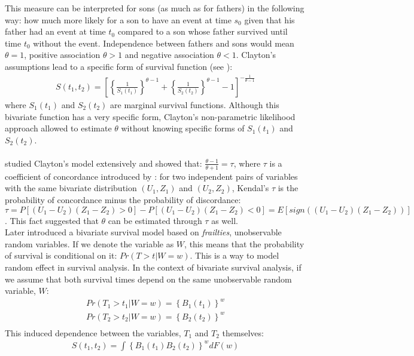 \documentclass[]{article}
\begin{document}
This measure can be interpreted for sons (as much as for fathers) in the following way: how much more likely for a son to have an event at time $s_0$ given that his father had an event at time $t_0$ compared to a son whose father survived until time $t_0$ without the event. Independence between fathers and sons would mean $\theta = 1$, positive association $\theta > 1$ and negative association $\theta < 1$.
Clayton's assumptions lead to a specific form of survival function (see \cite{oakes1989bivariate}):
$$
\begin{aligned}
S(t_1,t_2) = \left[\left\{ \frac{1}{S_1(t_1)} \right\}^{\theta - 1} + \left\{ \frac{1}{S_2(t_2)} \right\}^{\theta - 1}   - 1 \right]^{-\frac{1}{\theta-1}}
\end{aligned}
$$
where $S_1(t_1)$ and $S_2(t_2)$ are marginal survival functions. Although this bivariate function has a very specific form, Clayton's non-parametric likelihood approach allowed to estimate $\theta$ without knowing specific forms of $S_1(t_1)$ and $S_2(t_2)$.\\
~\\
\cite{oakes1982model} studied Clayton's model extensively and showed that: $\frac{\theta - 1}{\theta + 1} = \tau$, where $\tau$ is a coefficient of concordance introduced by  \cite{kendall1938new}: for two independent pairs of variables with the same bivariate distribution $(U_1, Z_1)$ and $(U_2, Z_2)$, Kendal's $\tau$ is the probability of concordance minus the probability of discordance:
$\tau = P[(U_1 - U_2)(Z_1 - Z_2)>0] - P[(U_1 - U_2)(Z_1 - Z_2)<0] = E[sign((U_1 - U_2)(Z_1 - Z_2))]$. This fact suggested that $\theta$ can be estimated through $\tau$ as well.\\

Later \cite{oakes1989bivariate} introduced a bivariate survival model based on \emph{frailties}, unobservable random variables. If we denote the variable as $W$, this means that the probability of survival is conditional on it: $Pr(T>t|W=w)$. This is a way to model random effect in survival analysis. In the context of bivariate survival analysis, if we assume that both survival times depend on the same unobservable random variable, $W$:
$$
\begin{aligned}
	Pr(T_1>t_1|W=w)=\left\{ B_1(t_1) \right\}^w\\
	Pr(T_2>t_2|W=w)=\left\{ B_2(t_2) \right\}^w\\
\end{aligned}
$$
This induced dependence between the variables, $T_1$ and $T_2$ themselves:
$$
\begin{aligned}
	S(t_1,t_2) = \int \left\{ B_1(t_1) B_2(t_2)\right\}^w dF(w)
\end{aligned}
$$
\end{document}

